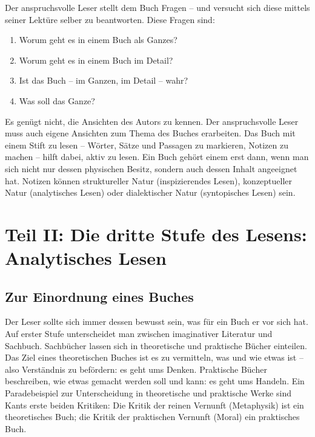 \documentclass[a4paper,11pt]{scrartcl}
\begin{document}
Der anspruchsvolle Leser stellt dem Buch Fragen – und versucht sich diese mittels seiner Lektüre selber zu beantworten. Diese Fragen sind:

\begin{enumerate}
    \item Worum geht es in einem Buch als Ganzes?
    \item Worum geht es in einem Buch im Detail?
    \item Ist das Buch – im Ganzen, im Detail – wahr?
    \item Was soll das Ganze?
\end{enumerate}

Es genügt nicht, die Ansichten des Autors zu kennen. Der anspruchsvolle Leser muss auch eigene Ansichten zum Thema des Buches erarbeiten. Das Buch mit einem Stift zu lesen – Wörter, Sätze und Passagen zu markieren, Notizen zu machen – hilft dabei, aktiv zu lesen. Ein Buch gehört einem erst dann, wenn man sich nicht nur dessen physischen Besitz, sondern auch dessen Inhalt angeeignet hat. Notizen können struktureller Natur (inspizierendes Lesen), konzeptueller Natur (analytisches Lesen) oder dialektischer Natur (syntopisches Lesen) sein.

\newpage
\section*{Teil II: Die  dritte Stufe des Lesens: Analytisches Lesen}

\subsection{Zur Einordnung eines Buches}

Der Leser sollte sich immer dessen bewusst sein, was für ein Buch er vor sich hat. Auf erster Stufe unterscheidet man zwischen imaginativer Literatur und Sachbuch. Sachbücher lassen sich in theoretische und praktische Bücher einteilen. Das Ziel eines theoretischen Buches ist es zu vermitteln, was und wie etwas ist – also Verständnis zu befördern: es geht ums Denken. Praktische Bücher beschreiben, wie etwas gemacht werden soll und kann: es geht ums Handeln. Ein Paradebeispiel zur Unterscheidung in theoretische und praktische Werke sind Kants erste beiden Kritiken: Die Kritik der reinen Vernunft (Metaphysik) ist ein theoretisches Buch; die Kritik der praktischen Vernunft (Moral) ein praktisches Buch.
\end{document}
